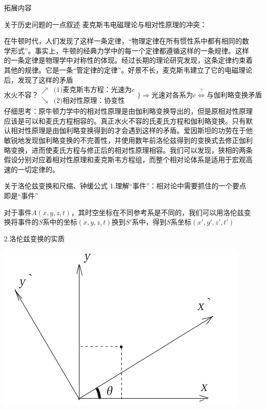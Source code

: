 \documentclass[a4paper,titlepage,onecolmn]{ctexart}
\begin{document}
\begin{section}{拓展内容}
\begin{subsection}{关于历史问题的一点叙述}
麦克斯韦电磁理论与相对性原理的冲突：

在牛顿时代，人们发现了这样一条定律，“物理定律在所有惯性系中都有相同的数学形式”。事实上，牛顿的经典力学中的每一个定律都遵循这样的一条规律。这样的一条定律是物理学中对称性的体现。经过长期的理论研究发现，这条定律约束着其他的规律。它是一条“管定律的定律”。好景不长，麦克斯韦建立了它的电磁理论后，发现了这样的矛盾
\begin{equation*}
\mbox{水火不容？}
\begin{array}{c}
\nearrow\\\searrow
\end{array}
\begin{array}{l}
\mbox{(1)麦克斯韦方程：光速为$c$}\\\mbox{(2)相对性原理：协变性}
\end{array}
\Bigg\}
\Rightarrow
\mbox{光速对各系为$c$}
\stackrel{?}{\iff}
\mbox{与伽利略变换矛盾}
\end{equation*}
仔细思考：原牛顿力学中的相对性原理是由伽利略变换导出的，但是原相对性原理应该是可以和麦氏方程相容的。真正水火不容的氏麦氏方程和伽利略变换。只有默认相对性原理是由伽利略变换得到的才会遇到这样的矛盾。爱因斯坦的功劳在于他敏锐地发现伽利略变换的不完善性，并使用数年前洛伦兹得到的变换式去修正伽利略变换，进而使麦氏方程与修正后的相对性原理相容。我们可以发现，狭相的两条假设分别对应着相对性原理和麦克斯韦方程组，而整个相对论体系是适用于宏观高速的一切定律的。
\end{subsection}

\begin{subsection}{关于洛伦兹变换和尺缩、钟缓公式}
1.理解“事件”：相对论中需要抓住的一个要点即是“事件”

对于事件$A(x,y,z,t)$，其时空坐标在不同参考系是不同的，我们可以用洛伦兹变换将事件的$S$系中的坐标$(x,y,z,t)$换到$S'$系中，得到$S$系坐标$(x',y',z',t')$

2.洛伦兹变换的实质
\begin{multicols}{2}
\hspace{4em}\includegraphics[scale=0.5]{Chp5_addin_illus (4).jpg}


\end{multicols}
\end{subsection}
\end{section}
\end{document}
